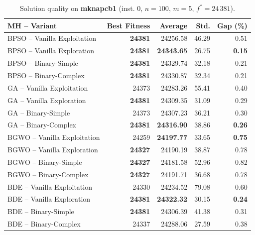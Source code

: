 \documentclass[journal,article,submit,moreauthors]{Definitions/mdpi}
\begin{document}
\begin{table}[htbp]
  \centering
  \small
  \caption{Solution quality on \textbf{mknapcb1} (inst. 0, $n=100$, $m=5$, $f^*=24\,381$).}
  \label{tab:calidad_mknapcb1_0}
  \begin{tabular}{lrrrr}
    \toprule
    \textbf{MH -- Variant} &
    \textbf{Best Fitness} &
    \textbf{Average} &
    \textbf{Std.} &
    \textbf{Gap (\%)} \\
    \midrule
    BPSO -- Vanilla Exploitation & \textbf{24381} &         24256.58 &  46.29 &         0.51 \\
    BPSO -- Vanilla Exploration  & \textbf{24381} & \textbf{24343.65} &  26.75 & \textbf{0.15} \\
    BPSO -- Binary-Simple        & \textbf{24381} &         24329.74 &  32.18 &         0.21 \\
    BPSO -- Binary-Complex       & \textbf{24381} &         24330.87 &  32.34 &         0.21 \\
    \midrule
    GA -- Vanilla Exploitation   &          24373 &         24283.26 &  55.41 &         0.40 \\
    GA -- Vanilla Exploration    & \textbf{24381} &         24309.35 &  31.09 &         0.29 \\
    GA -- Binary-Simple          &          24373 &         24307.23 &  36.21 &         0.30 \\
    GA -- Binary-Complex         & \textbf{24381} & \textbf{24316.90} &  38.86 & \textbf{0.26} \\
    \midrule
    BGWO -- Vanilla Exploitation &          24259 & \textbf{24197.77} &  33.65 & \textbf{0.75} \\
    BGWO -- Vanilla Exploration  & \textbf{24327} &         24190.19 &  38.87 &         0.78 \\
    BGWO -- Binary-Simple        & \textbf{24327} &         24181.58 &  52.96 &         0.82 \\
    BGWO -- Binary-Complex       & \textbf{24327} &         24191.71 &  36.68 &         0.78 \\
    \midrule
    BDE -- Vanilla Exploitation  &          24330 &         24234.52 &  79.08 &         0.60 \\
    BDE -- Vanilla Exploration   & \textbf{24381} & \textbf{24322.32} &  30.15 & \textbf{0.24} \\
    BDE -- Binary-Simple         & \textbf{24381} &         24306.39 &  41.38 &         0.31 \\
    BDE -- Binary-Complex        &          24337 &         24288.06 &  27.59 &         0.38 \\
    \bottomrule
  \end{tabular}
\end{table}
\end{document}
